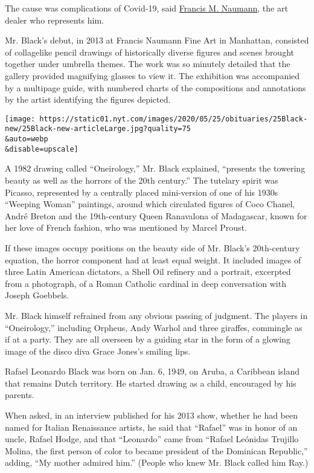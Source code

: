 The cause was complications of Covid-19, said
\href{http://www.francisnaumann.com/BLACK/Obit.html}{Francis M.
Naumann}, the art dealer who represents him.

Mr. Black's debut, in 2013 at Francis Naumann Fine Art in Manhattan,
consisted of collagelike pencil drawings of historically diverse figures
and scenes brought together under umbrella themes. The work was so
minutely detailed that the gallery provided magnifying glasses to view
it. The exhibition was accompanied by a multipage guide, with numbered
charts of the compositions and annotations by the artist identifying the
figures depicted.

\texttt{[image: https://static01.nyt.com/images/2020/05/25/obituaries/25Black-new/25Black-new-articleLarge.jpg?quality=75\\\&auto=webp\\\&disable=upscale]}

A 1982 drawing called ``Oneirology,'' Mr. Black explained, ``presents
the towering beauty as well as the horrors of the 20th century.'' The
tutelary spirit was Picasso, represented by a centrally placed
mini-version of one of his 1930s ``Weeping Woman'' paintings, around
which circulated figures of Coco Chanel, André Breton and the
19th-century Queen Ranavalona of Madagascar, known for her love of
French fashion, who was mentioned by Marcel Proust.

If these images occupy positions on the beauty side of Mr. Black's
20th-century equation, the horror component had at least equal weight.
It included images of three Latin American dictators, a Shell Oil
refinery and a portrait, excerpted from a photograph, of a Roman
Catholic cardinal in deep conversation with Joseph Goebbels.

Mr. Black himself refrained from any obvious passing of judgment. The
players in ``Oneirology,'' including Orpheus, Andy Warhol and three
giraffes, commingle as if at a party. They are all overseen by a guiding
star in the form of a glowing image of the disco diva Grace Jones's
smiling lips.

Rafael Leonardo Black was born on Jan. 6, 1949, on Aruba, a Caribbean
island that remains Dutch territory. He started drawing as a child,
encouraged by his parents.

When asked, in an interview published for his 2013 show, whether he had
been named for Italian Renaissance artists, he said that ``Rafael'' was
in honor of an uncle, Rafael Hodge, and that ``Leonardo'' came from
``Rafael Leónidas Trujillo Molina, the first person of color to became
president of the Dominican Republic,'' adding, ``My mother admired
him.'' (People who knew Mr. Black called him Ray.)

